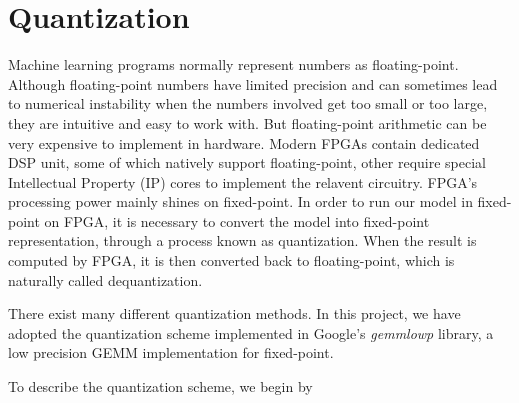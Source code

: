 
\chapter{Quantization}

Machine learning programs normally represent numbers as floating-point. Although floating-point numbers
have limited precision and can sometimes lead to numerical instability when the numbers involved get too
small or too large, they are intuitive and easy to work with. But floating-point arithmetic can be very
expensive to implement in hardware. Modern FPGAs contain dedicated DSP unit, some of which natively
support floating-point, other require special Intellectual Property (IP) cores to implement the relavent
circuitry. FPGA's processing power mainly shines on fixed-point. In order to run our model in fixed-point
on FPGA, it is necessary to convert the model into fixed-point representation, through a process known as
quantization. When the result is computed by FPGA, it is then converted back to floating-point, which is
naturally called dequantization.

There exist many different quantization methods. In this project, we have adopted the quantization scheme
implemented in Google's \textit{gemmlowp} library, a low precision GEMM implementation for fixed-point.

To describe the quantization scheme, we begin by 

\clearpage %
